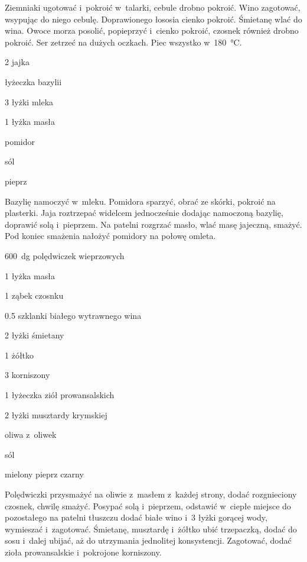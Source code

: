\documentclass[../kucharek.tex]{subfiles}
\begin{document}
Ziemniaki ugotować i~pokroić w~talarki, cebule drobno pokroić. Wino zagotować,
wsypując do niego cebulę. Doprawionego łososia cienko pokroić. Śmietanę wlać do
wina. Owoce morza posolić, popieprzyć i~cienko pokroić, czosnek również drobno
pokroić. Ser zetrzeć na dużych oczkach. Piec wszystko w~\qty{180}{\celsius}.


\begin{Ingred}
    \item \num{2} jajka
    \item łyżeczka bazylii
    \item \num{3} łyżki mleka
    \item \num{1} łyżka masła
    \item pomidor
    \item sól
    \item pieprz
\end{Ingred}

Bazylię namoczyć w~mleku. Pomidora sparzyć, obrać ze skórki, pokroić na
plasterki. Jaja roztrzepać widelcem jednocześnie dodając namoczoną bazylię,
doprawić solą i~pieprzem. Na patelni rozgrzać masło, wlać masę jajeczną,
smażyć. Pod koniec smażenia nałożyć pomidory na połowę omleta.


\begin{Ingred}
    \item \qty{600}{\deca\gram} polędwiczek wieprzowych
    \item \num{1} łyżka masła
    \item \num{1} ząbek czosnku
    \item \num{.5} szklanki białego wytrawnego wina
    \item \num{2} łyżki śmietany
    \item \num{1} żółtko
    \item \num{3} korniszony
    \item \num{1} łyżeczka ziół prowansalskich
    \item \num{2} łyżki musztardy krymskiej
    \item oliwa z~oliwek
    \item sól
    \item mielony pieprz czarny
\end{Ingred}

Polędwiczki przysmażyć na oliwie z~masłem z~każdej strony, dodać rozgnieciony
czosnek, chwilę smażyć. Posypać solą i~pieprzem, odstawić w~ciepłe miejsce do
pozostałego na patelni tłuszczu dodać białe wino i~\num{3} łyżki gorącej wody,
wymieszać i~zagotować. Śmietanę, musztardę i~żółtko ubić trzepaczką, dodać do
sosu i~dalej ubijać, aż do utrzymania jednolitej konsystencji. Zagotować, dodać
zioła prowansalskie i~pokrojone korniszony.
\end{document}
